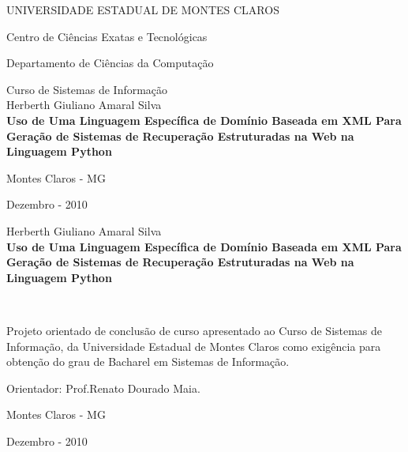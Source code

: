 \documentclass[a4paper,12pt]{report}
\begin{document}
\begin{titlepage}
\begin{center}
UNIVERSIDADE ESTADUAL DE MONTES CLAROS

Centro de Ciências Exatas e Tecnológicas

Departamento de Ciências da Computação

Curso de Sistemas de Informação
\\[2cm]
Herberth Giuliano Amaral Silva
\\[7cm]
\textbf {Uso de Uma Linguagem Específica de Domínio Baseada em XML Para Geração de Sistemas de Recuperação Estruturadas na Web na Linguagem Python}

\vfill
Montes Claros - MG

Dezembro - 2010



\end{center}
\end{titlepage}

\addtocounter{page}{+1}
\thispagestyle{plain}

\begin{center}
	Herberth Giuliano Amaral Silva
	\\[4cm]
	\textbf{Uso de Uma Linguagem Específica de Domínio Baseada em XML Para Geração de Sistemas de Recuperação Estruturadas na Web na Linguagem Python}
\end{center}
	\ \\[3cm]
	
\begin{flushright}
	\begin{small}
		\parbox{200pt}{Projeto orientado de conclusão de curso apresentado ao Curso de Sistemas de Informação,	da Universidade Estadual de Montes Claros como exigência para obtenção do grau de Bacharel	em Sistemas de Informação.}

		\parbox{200pt}{Orientador: Prof.Renato Dourado Maia.}
		
	\end{small}
\end{flushright}

\begin{center}	
	\vfill
	Montes Claros - MG
	
	Dezembro - 2010 
\end{center}

\renewcommand{\contentsname}{Sumário}
\renewcommand{\chaptername}{Capítulo}
\renewcommand{\figurename}{Figura}
\renewcommand{\bibname}{Bibliografia}
\renewcommand{\lstlistingname}{Listagem}
\renewcommand{\appendixname}{Apêndice}
\renewcommand{\listfigurename}{Lista de Figuras}
\renewcommand{\listlistingname}{Lista de Listagens}
\allsectionsfont{\large}
\chapterfont{\Large}
\end{document}
